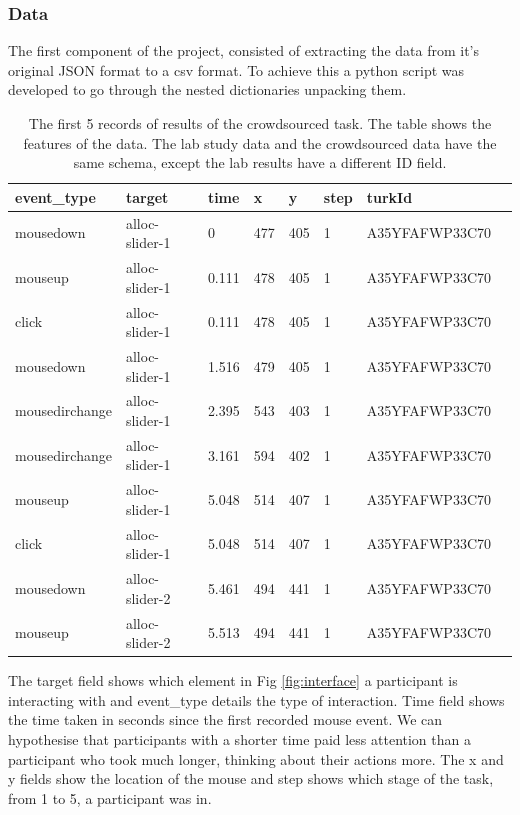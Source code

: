 \documentclass{article}
\begin{document}

\subsubsection{Data}



The first component of the project, consisted of extracting the data from it's original JSON format to a csv format.
To achieve this a python script was developed to go through the nested dictionaries unpacking them.

\begin{table}[ht]
    \caption{\label{table:data} The first 5 records of results of the crowdsourced task.
        The table shows the features of the data.
        The lab study data and the crowdsourced data have the same schema, except the lab results have a different ID field.
    }
    \begin{tabular}{llllllll}
        \hline
        event\_type    & target         & time  & x   & y   & step & turkId         \\ \hline
        mousedown      & alloc-slider-1 & 0     & 477 & 405 & 1    & A35YFAFWP33C70 \\
        mouseup        & alloc-slider-1 & 0.111 & 478 & 405 & 1    & A35YFAFWP33C70 \\
        click          & alloc-slider-1 & 0.111 & 478 & 405 & 1    & A35YFAFWP33C70 \\
        mousedown      & alloc-slider-1 & 1.516 & 479 & 405 & 1    & A35YFAFWP33C70 \\
        mousedirchange & alloc-slider-1 & 2.395 & 543 & 403 & 1    & A35YFAFWP33C70 \\
        mousedirchange & alloc-slider-1 & 3.161 & 594 & 402 & 1    & A35YFAFWP33C70 \\
        mouseup        & alloc-slider-1 & 5.048 & 514 & 407 & 1    & A35YFAFWP33C70 \\
        click          & alloc-slider-1 & 5.048 & 514 & 407 & 1    & A35YFAFWP33C70 \\
        mousedown      & alloc-slider-2 & 5.461 & 494 & 441 & 1    & A35YFAFWP33C70 \\
        mouseup        & alloc-slider-2 & 5.513 & 494 & 441 & 1    & A35YFAFWP33C70 \\ \hline
    \end{tabular}
\end{table}

The target field shows which element in Fig \ref{fig:interface} a participant is interacting with and event\_type details the type of interaction.
Time field shows the time taken in seconds since the first recorded mouse event.
We can hypothesise that participants with a shorter time paid less attention than a participant who took much longer, thinking about their actions more.
The x and y fields show the location of the mouse and step shows which stage of the task, from 1 to 5, a participant was in.
\end{document}
